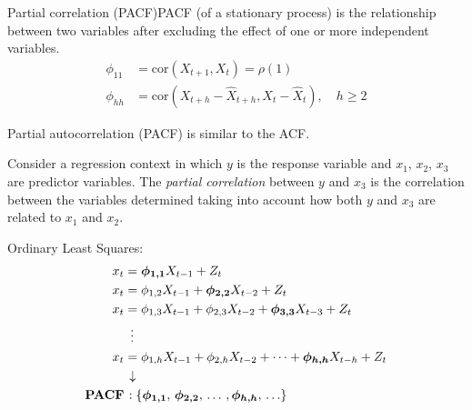 \begin{definition}{Partial correlation (PACF)}{PACF}
    (of a stationary process) is the relationship between two variables after excluding 
    the effect of one or more independent variables.
    \tcblower
    \begin{align*}
        \phi_{11} &= \text{cor}(X_{t+1}, X_t) = \rho(1) \\
        \phi_{hh} &= \text{cor}(X_{t+h} - \hat X_{t+h}, X_t - \hat X_t),\quad h \geq 2
    \end{align*}

    \begin{note}
        Partial autocorrelation (PACF) is similar to the ACF.
    \end{note}

    \begin{example*}{}
        Consider a regression context in which $y$ is the response variable
        and $x_1,\,x_2,\,x_3$ are predictor variables. The \emph{partial correlation}
        between $y$ and $x_3$ is the correlation between the variables determined
        taking into account how both $y$ and $x_3$ are related to $x_1$ and $x_2$.
    \end{example*}

    \tcbline

    Ordinary Least Squares:
    \begin{align*}
        x_t &= \boldsymbol{\phi_{1,1}} X_{t-1} + Z_t \\
        x_t &= \phi_{1,2} X_{t-1} + \boldsymbol{\phi_{2,2}} X_{t-2} + Z_t \\
        x_t &= \phi_{1,3} X_{t-1} + \phi_{2,3} X_{t-2} + \boldsymbol{\phi_{3,3}} X_{t-3} + Z_t \\
            &\hspace{0.5em}\vdots \\
        x_t &= \phi_{1,h} X_{t-1} + \phi_{2,h} X_{t-2} + \dots + \boldsymbol{\phi_{h,h}} X_{t-h} + Z_t \\
            &\hspace{0.15em}\downarrow \\
        \textbf{PACF} &\hspace{0.1em}: \left\{
            \boldsymbol{\phi_{1,1}},\,
            \boldsymbol{\phi_{2,2}},\,\ldots\,,
            \boldsymbol{\phi_{h,h}},\,\ldots  \right\}
    \end{align*}
\end{definition}

